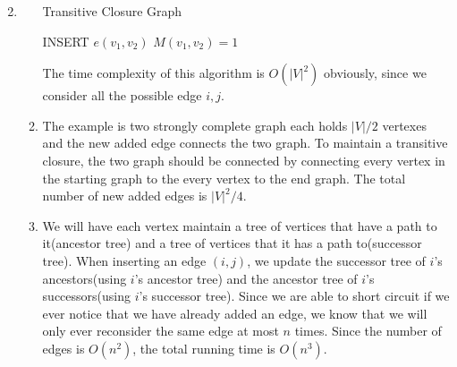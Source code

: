 \documentclass[12pt,a4paper]{article}
\makeatletter
\newtheorem*{solution}{Solution}
\theoremstyle{definition}
\renewenvironment{solution}[1][Solution] {\par\pushQED{\qed}\normalfont\topsep6\p@\@plus6\p@\relax\trivlist\item[\hskip\labelsep\bfseries#1\@addpunct{.}]\ignorespaces}{\popQED\endtrivlist\@endpefalse} \makeatother
\makeatother
\begin{document}
\begin{enumerate}
\begin{solution}
\begin{enumerate}
\begin{algorithm}[H]
				\BlankLine
				\caption{Transitive Closure Graph}\label{Alg-Single-Transitive Closure}
	
				INSERT $e(v_1,v_2)$\;
				$M(v_1,v_2)=1$\;
	
			\end{algorithm}
			The time complexity of this algorithm is $O(|V|^2)$ obviously, since we consider all the possible edge $i,j$.
			\item The example is two strongly complete graph each holds $|V|/2$ vertexes and the new added edge connects the two graph. To maintain a transitive closure, the two graph should be connected by connecting every vertex in the starting graph to the every vertex to the end graph. The total number of new added edges is $|V|^2/4$.
			\item We will have each vertex maintain a tree of vertices that have a path to it(ancestor tree) and a tree of vertices that it has a path to(successor tree). When inserting an edge $(i,j)$, we update the successor tree of $i$'s ancestors(using $i$'s ancestor tree) and the ancestor tree of $i$'s successors(using $i$'s successor tree). Since we are able to short circuit if we ever notice that we have already added an edge, we know that we will only ever reconsider the same edge at most $n$ times. Since the number of edges is $O(n^2)$, the total running time is $O(n^3)$.
			\end{enumerate}
	\end{solution}
	

\end{enumerate}
\end{document}

